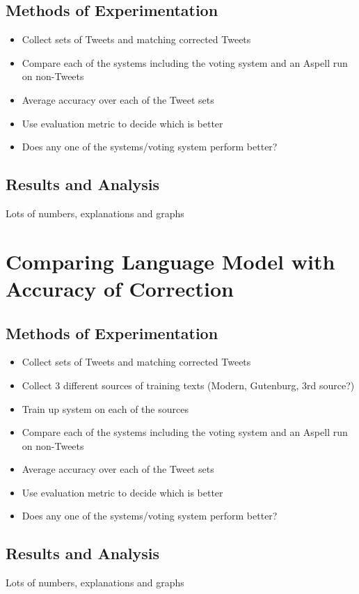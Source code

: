 \subsection{Methods of Experimentation}
\begin{itemize}
	\item Collect sets of Tweets and matching corrected Tweets
	\item Compare each of the systems including the voting system and an Aspell run on non-Tweets
	\item Average accuracy over each of the Tweet sets
	\item Use evaluation metric to decide which is better
	\item Does any one of the systems/voting system perform better?
\end{itemize}

\subsection{Results and Analysis}
Lots of numbers, explanations and graphs

\section{Comparing Language Model with Accuracy of Correction}
\subsection{Methods of Experimentation}
\begin{itemize}
	\item Collect sets of Tweets and matching corrected Tweets
	\item Collect 3 different sources of training texts (Modern, Gutenburg, 3rd source?)
	\item Train up system on each of the sources
	\item Compare each of the systems including the voting system and an Aspell run on non-Tweets
	\item Average accuracy over each of the Tweet sets
	\item Use evaluation metric to decide which is better
	\item Does any one of the systems/voting system perform better?
\end{itemize}

\subsection{Results and Analysis}
Lots of numbers, explanations and graphs

